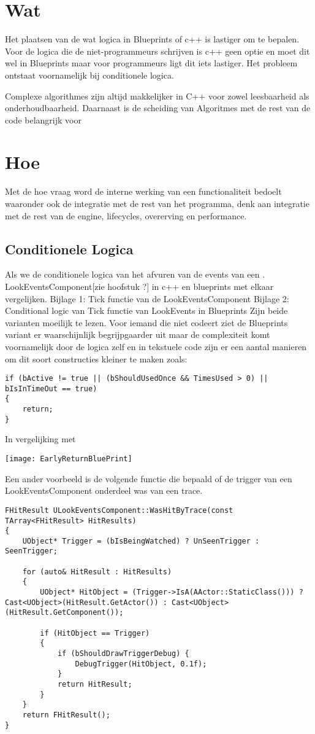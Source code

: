 \section{Wat}

Het plaatsen van de wat logica in Blueprints of c++ is lastiger om te bepalen. Voor de logica die de niet-programmeurs schrijven is c++ geen optie en moet dit wel in Blueprints maar voor programmeurs ligt dit iets lastiger. Het probleem ontstaat voornamelijk bij conditionele logica.

Complexe algorithmes zijn altijd makkelijker in C++ voor zowel leesbaarheid als onderhoudbaarheid. Daarnaast is de scheiding van Algoritmes met de rest van de code belangrijk voor 

\section{Hoe}
Met de hoe vraag word de interne werking van een functionaliteit bedoelt waaronder ook de integratie met de rest van het programma, denk aan integratie met de rest van de engine, lifecycles, overerving en performance.

\subsection{Conditionele Logica}

Als we de conditionele logica van het afvuren van de events van een .
LookEventsComponent[zie hoofstuk ?] in c++ en blueprints met elkaar vergelijken.
Bijlage 1: Tick functie van de LookEventsComponent 
Bijlage 2: Conditional logic van Tick functie van LookEvents in Blueprints
Zijn beide varianten moeilijk te lezen. Voor iemand die niet codeert ziet de Blueprints variant er waarschijnlijk begrijpgaarder uit maar de complexiteit komt voornamelijk door de logica zelf en in tekstuele code zijn er een aantal manieren om dit soort constructies kleiner te maken zoals:

\begin{lstlisting}
if (bActive != true || (bShouldUsedOnce && TimesUsed > 0) || bIsInTimeOut == true) 
{
	return;
}
\end{lstlisting}
In vergelijking met 

\texttt{[image: EarlyReturnBluePrint]}

Een ander voorbeeld is de volgende functie die bepaald of de trigger van een LookEventsComponent onderdeel was van een trace.

\begin{lstlisting}
FHitResult ULookEventsComponent::WasHitByTrace(const TArray<FHitResult> HitResults) 
{
	UObject* Trigger = (bIsBeingWatched) ? UnSeenTrigger : SeenTrigger;

	for (auto& HitResult : HitResults)
	{
		UObject* HitObject = (Trigger->IsA(AActor::StaticClass())) ? Cast<UObject>(HitResult.GetActor()) : Cast<UObject>(HitResult.GetComponent());	

		if (HitObject == Trigger)
		{
			if (bShouldDrawTriggerDebug) {
				DebugTrigger(HitObject, 0.1f);
			}
			return HitResult;
		}
	}
	return FHitResult();
}
\end{lstlisting}

